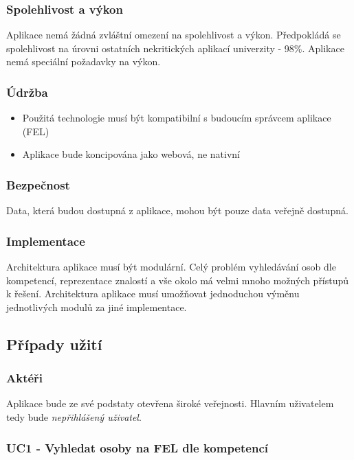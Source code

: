 \subsubsection{Spolehlivost a výkon}
Aplikace nemá žádná zvláštní omezení na spolehlivost a výkon. Předpokládá se spolehlivost na úrovni ostatních nekritických aplikací univerzity - 98\%. Aplikace nemá speciální požadavky na výkon.
\subsubsection{Údržba}
\begin{itemize}
    \item Použitá technologie musí být kompatibilní s budoucím správcem aplikace (FEL)
    \item Aplikace bude koncipována jako webová, ne nativní
\end{itemize}
\subsubsection{Bezpečnost}
Data, která budou dostupná z aplikace, mohou být pouze data veřejně dostupná.
\subsubsection{Implementace}
Architektura aplikace musí být modulární. Celý problém vyhledávání osob dle kompetencí, reprezentace znalostí a vše okolo má velmi mnoho možných přístupů k řešení. Architektura aplikace musí umožňovat jednoduchou výměnu jednotlivých modulů za jiné implementace.
\subsection{Případy užití}
\subsubsection{Aktéři}
Aplikace bude ze své podstaty otevřena široké veřejnosti. Hlavním uživatelem tedy bude \textit{nepřihlášený uživatel}.
\subsubsection{UC1 - Vyhledat osoby na FEL dle kompetencí} \label{UC1}
